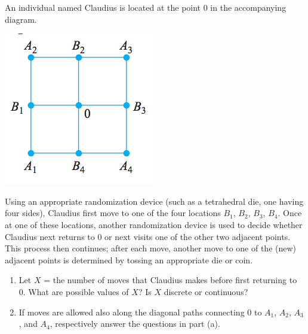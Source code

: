 \documentclass[11pt,letterpaper,boxed]{hmcpset}
\begin{document}
 {



\begin{problem}[3.1.9]
	An individual named Claudius is located at the point 0 in the accompanying diagram.\\
	\begin{center}
		\includegraphics{Nov_10_1.png}
	\end{center}
	Using an appropriate randomization device (such as a tetrahedral die, one having four sides), Claudius first move to one of the four locations $B_1$, $B_2$, $B_3$, $B_4$. Once at one of these locations, another randomization device is used to decide whether Claudius next returns to 0 or next visits one of the other two adjacent points. This process then continues; after each move, another move to one of the (new) adjacent points is determined by tossing an appropriate die or coin.
	\begin{enumerate}
		\item
			Let $X$ = the number of moves that Claudius makes before first returning to 0. What are possible values of $X$? Is $X$ discrete or continuous?
		\item
			If moves are allowed also along the diagonal paths connecting 0 to $A_1$, $A_2$, $A_3$, and $A_4$, respectively answer the questions in part (a).
	\end{enumerate}
\end{problem}

\begin{solution}
	\vfill
\end{solution}
\newpage


}
\end{document}
